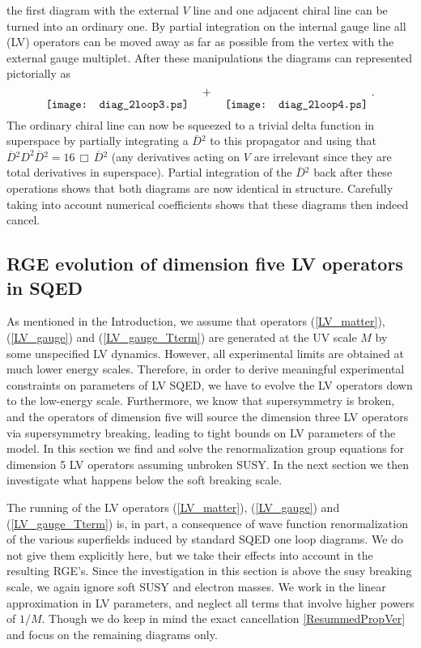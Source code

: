 \documentclass[12pt]{revtex4}
\begin{document}
the first diagram with the external $V$ line and one adjacent chiral
line can be turned into an ordinary one. By partial integration on
the internal gauge line all (LV) operators can be moved away as far as
possible from the vertex with the external gauge multiplet. After
these manipulations the diagrams can represented pictorially as  
\begin{equation}
\raisebox{-2.5ex}{\texttt{[image: diag\_2loop3.ps]}}
\quad + \quad 
\raisebox{-2.5ex}{\texttt{[image: diag\_2loop4.ps]}}
~.
\end{equation} 
The ordinary chiral line can now be squeezed to a trivial delta
function in superspace by partially integrating a $\overline{D}{}^2$ to
this propagator and using that 
$\overline{D}{}^2 D^2 \overline{D}{}^2 = 16\, \Box\, \overline{D}{}^2$ 
(any derivatives acting on $V$ are irrelevant since they are total
derivatives in superspace). 
Partial integration of the
$\overline{D}{}^2$ back after these operations shows that both diagrams
are now identical in structure. Carefully taking into account 
numerical coefficients shows that these diagrams then indeed cancel. 








\subsection{RGE evolution of dimension five LV operators in SQED}
\label{RGEvolution}




As mentioned in the Introduction, we assume that operators
(\ref{LV_matter}), (\ref{LV_gauge}) and (\ref{LV_gauge_Tterm})  
are generated at the UV scale $M$ by some unspecified LV dynamics. 
However, all experimental limits are obtained at much lower energy
scales. Therefore, in order to derive meaningful experimental
constraints on parameters of LV SQED, we have to evolve the LV
operators down to the low-energy scale. Furthermore, we know that
supersymmetry is broken, and the operators of dimension five will
source  the dimension three LV operators via supersymmetry
breaking, leading to tight bounds on LV parameters of the model.
In this section we find and solve the renormalization group equations     
for dimension 5 LV operators assuming unbroken SUSY. In the next
section we then investigate what happens below the soft breaking
scale. 


The running of the LV operators (\ref{LV_matter}), (\ref{LV_gauge})
and (\ref{LV_gauge_Tterm}) is, in part, a consequence of wave
function renormalization of the various superfields induced by
standard SQED one loop diagrams. We do not give them explicitly here,
but we take their effects into account in the resulting RGE's. 
Since the investigation in this section is above the susy breaking
scale, we again ignore soft SUSY and electron masses. 
We work in the linear approximation in LV parameters, and
neglect all terms that involve higher powers of $1/M$. Though we do
keep in mind the exact cancellation \eqref{ResummedPropVer} 
and focus on the remaining diagrams only. 
\end{document}

